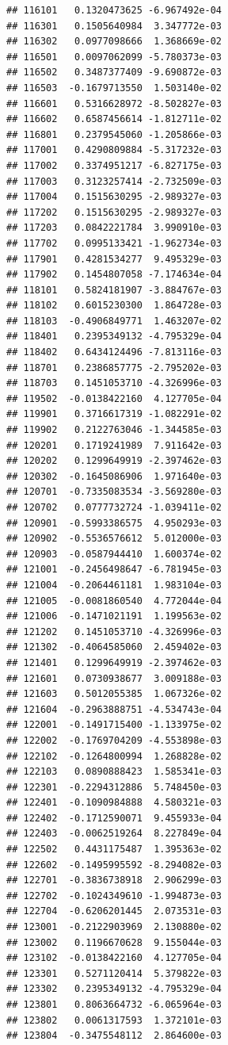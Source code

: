 \documentclass[ignorenonframetext,]{beamer}
\begin{document}
\begin{frame}[fragile]
\begin{verbatim}
## 116101   0.1320473625 -6.967492e-04
## 116301   0.1505640984  3.347772e-03
## 116302   0.0977098666  1.368669e-02
## 116501   0.0097062099 -5.780373e-03
## 116502   0.3487377409 -9.690872e-03
## 116503  -0.1679713550  1.503140e-02
## 116601   0.5316628972 -8.502827e-03
## 116602   0.6587456614 -1.812711e-02
## 116801   0.2379545060 -1.205866e-03
## 117001   0.4290809884 -5.317232e-03
## 117002   0.3374951217 -6.827175e-03
## 117003   0.3123257414 -2.732509e-03
## 117004   0.1515630295 -2.989327e-03
## 117202   0.1515630295 -2.989327e-03
## 117203   0.0842221784  3.990910e-03
## 117702   0.0995133421 -1.962734e-03
## 117901   0.4281534277  9.495329e-03
## 117902   0.1454807058 -7.174634e-04
## 118101   0.5824181907 -3.884767e-03
## 118102   0.6015230300  1.864728e-03
## 118103  -0.4906849771  1.463207e-02
## 118401   0.2395349132 -4.795329e-04
## 118402   0.6434124496 -7.813116e-03
## 118701   0.2386857775 -2.795202e-03
## 118703   0.1451053710 -4.326996e-03
## 119502  -0.0138422160  4.127705e-04
## 119901   0.3716617319 -1.082291e-02
## 119902   0.2122763046 -1.344585e-03
## 120201   0.1719241989  7.911642e-03
## 120202   0.1299649919 -2.397462e-03
## 120302  -0.1645086906  1.971640e-03
## 120701  -0.7335083534 -3.569280e-03
## 120702   0.0777732724 -1.039411e-02
## 120901  -0.5993386575  4.950293e-03
## 120902  -0.5536576612  5.012000e-03
## 120903  -0.0587944410  1.600374e-02
## 121001  -0.2456498647 -6.781945e-03
## 121004  -0.2064461181  1.983104e-03
## 121005  -0.0081860540  4.772044e-04
## 121006  -0.1471021191  1.199563e-02
## 121202   0.1451053710 -4.326996e-03
## 121302  -0.4064585060  2.459402e-03
## 121401   0.1299649919 -2.397462e-03
## 121601   0.0730938677  3.009188e-03
## 121603   0.5012055385  1.067326e-02
## 121604  -0.2963888751 -4.534743e-04
## 122001  -0.1491715400 -1.133975e-02
## 122002  -0.1769704209 -4.553898e-03
## 122102  -0.1264800994  1.268828e-02
## 122103   0.0890888423  1.585341e-03
## 122301  -0.2294312886  5.748450e-03
## 122401  -0.1090984888  4.580321e-03
## 122402  -0.1712590071  9.455933e-04
## 122403  -0.0062519264  8.227849e-04
## 122502   0.4431175487  1.395363e-02
## 122602  -0.1495995592 -8.294082e-03
## 122701  -0.3836738918  2.906299e-03
## 122702  -0.1024349610 -1.994873e-03
## 122704  -0.6206201445  2.073531e-03
## 123001  -0.2122903969  2.130880e-02
## 123002   0.1196670628  9.155044e-03
## 123102  -0.0138422160  4.127705e-04
## 123301   0.5271120414  5.379822e-03
## 123302   0.2395349132 -4.795329e-04
## 123801   0.8063664732 -6.065964e-03
## 123802   0.0061317593  1.372101e-03
## 123804  -0.3475548112  2.864600e-03

\end{verbatim}
\end{frame}
\end{document}
